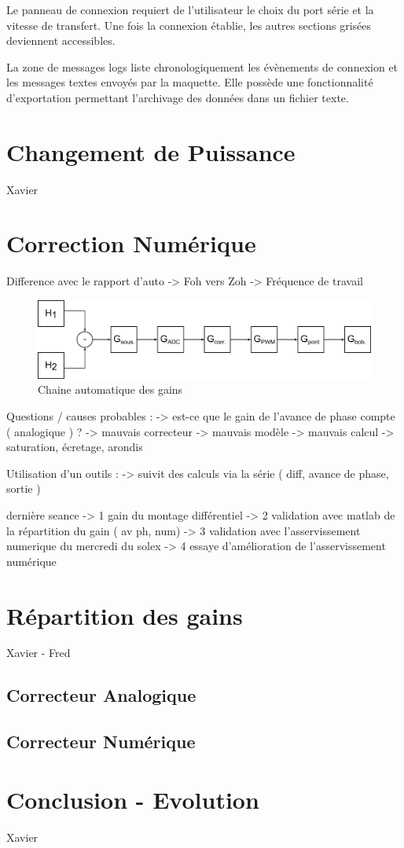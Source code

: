 \documentclass[11pt, french]{article} %
\begin{document}
Le panneau de connexion requiert de l'utilisateur le choix du port série et la vitesse de transfert. Une fois la connexion établie, les autres sections grisées deviennent accessibles. 

La zone de messages logs liste chronologiquement les évènements de connexion et les messages textes envoyés par la maquette. Elle possède une fonctionnalité d'exportation permettant l'archivage des données dans un fichier texte.

\section{Changement de Puissance}
Xavier
\section{Correction Numérique}

Difference avec le rapport d'auto
-> Foh vers Zoh
-> Fréquence de travail

\begin{figure}[h!]
	\centering
	\includegraphics[width = 16cm]{SolutionNumerique/Gain.png} 
	\caption{Chaine automatique des gains}
\end{figure}

Questions / causes probables :
-> est-ce que le gain de l'avance de phase compte ( analogique ) ?
-> mauvais correcteur
-> mauvais modèle
-> mauvais calcul -> saturation, écretage, arondis

Utilisation d'un outils :
-> suivit des calculs via la série ( diff, avance de phase, sortie )

dernière seance
-> 1 gain du montage différentiel
-> 2 validation avec matlab de la répartition du gain ( av ph, num)
-> 3 validation avec l'asservissement numerique du mercredi du solex
-> 4 essaye d'amélioration de l'asservissement numérique


\section{Répartition des gains}
Xavier - Fred
\subsection{Correcteur Analogique}
\subsection{Correcteur Numérique}
\section*{Conclusion - Evolution}
Xavier
\end{document}
